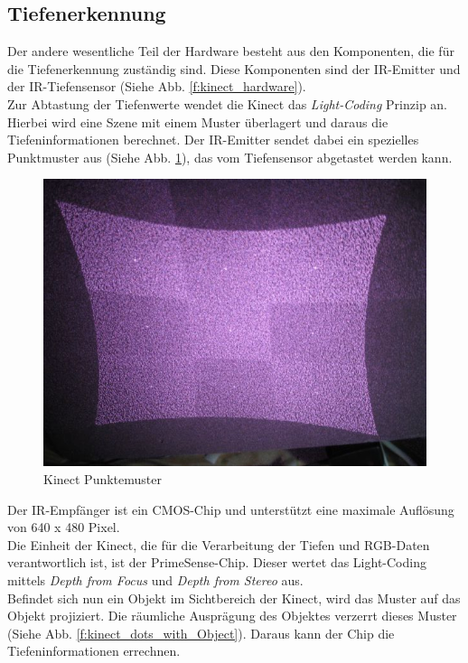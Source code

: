 \subsection{Tiefenerkennung}
	
	Der andere wesentliche Teil der Hardware besteht aus den Komponenten, die für die Tiefenerkennung
	zuständig sind. Diese Komponenten sind der \acf{IR-Emitter} und der IR-Tiefensensor (Siehe	 Abb. 	 
	\ref{f:kinect_hardware}).\\
	\noindent
	Zur Abtastung der Tiefenwerte wendet die Kinect das \textit{Light-Coding} Prinzip an. Hierbei wird
	eine Szene mit einem Muster überlagert und daraus die Tiefeninformationen berechnet.
	Der \acs{IR-Emitter} sendet dabei ein spezielles Punktmuster aus (Siehe Abb. \ref{f:kinect_dots}),
	das vom Tiefensensor abgetastet werden kann.	
	
	\begin{figure}[H]						
		\centering							
		\includegraphics[scale=0.5]{Bilder/kinect_dots.jpg}			
		\caption{Kinect Punktemuster}						
		\label{f:kinect_dots}						
	\end{figure}
	
	\noindent	
	Der IR-Empfänger ist ein \acf{CMOS}-Chip und unterstützt eine maximale Auflösung
	von 640 x 480 Pixel.
	\\
	Die Einheit der Kinect, die für die Verarbeitung der Tiefen und RGB-Daten verantwortlich ist, ist
	der PrimeSense-Chip. Dieser wertet das Light-Coding mittels \textit{Depth from Focus} und 
	\textit{Depth from Stereo} aus.\cite{pdf:maccormick}
	\\
	Befindet sich nun ein Objekt im Sichtbereich der Kinect, wird das Muster auf das Objekt projiziert. Die räumliche Ausprägung des Objektes verzerrt dieses Muster (Siehe Abb. \ref{f:kinect_dots_with_Object}). Daraus kann der Chip die Tiefeninformationen errechnen.		
	
